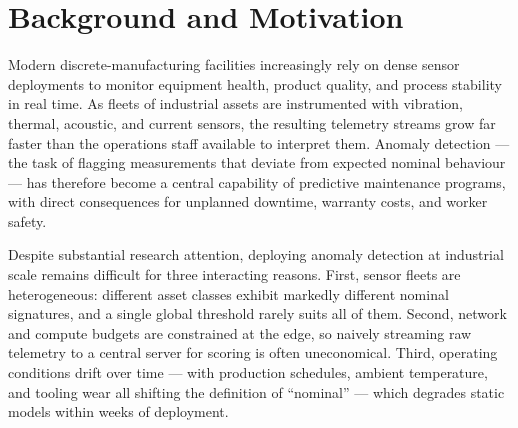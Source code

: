 \section{Background and Motivation}
Modern discrete-manufacturing facilities increasingly rely on dense sensor deployments to
monitor equipment health, product quality, and process stability in real time. As fleets of
industrial assets are instrumented with vibration, thermal, acoustic, and current sensors,
the resulting telemetry streams grow far faster than the operations staff available to
interpret them. Anomaly detection --- the task of flagging measurements that deviate from
expected nominal behaviour --- has therefore become a central capability of predictive
maintenance programs, with direct consequences for unplanned downtime, warranty costs, and
worker safety.

Despite substantial research attention, deploying anomaly detection at industrial scale
remains difficult for three interacting reasons. First, sensor fleets are heterogeneous:
different asset classes exhibit markedly different nominal signatures, and a single global
threshold rarely suits all of them. Second, network and compute budgets are constrained at
the edge, so naively streaming raw telemetry to a central server for scoring is often
uneconomical. Third, operating conditions drift over time --- with production schedules,
ambient temperature, and tooling wear all shifting the definition of ``nominal'' --- which
degrades static models within weeks of deployment.

